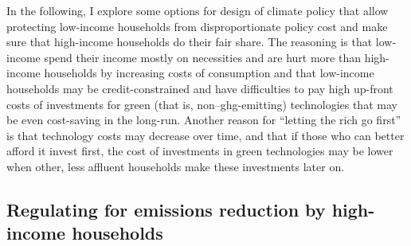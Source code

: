 \documentclass[a4paper,11pt,abstract=true]{scrartcl}
\begin{document}
In the following, I explore some options for design of climate policy that allow protecting low-income households from disproportionate policy cost and make sure that high-income households do their fair share.
The reasoning is that low-income spend their income mostly on necessities and are hurt more than high-income households by increasing costs of consumption and that low-income households may be credit-constrained and have difficulties to pay high up-front costs of investments for green (that is, non--\ac{ghg}-emitting) technologies that may be even cost-saving in the long-run.
Another reason for ``letting the rich go first'' is that technology costs may decrease over time, and that if those who can better afford it invest first, the cost of investments in green technologies may be lower when other, less affluent households make these investments later on.

\subsection{Regulating for emissions reduction by high-income households}
\label{sec:rvp}
\end{document}
